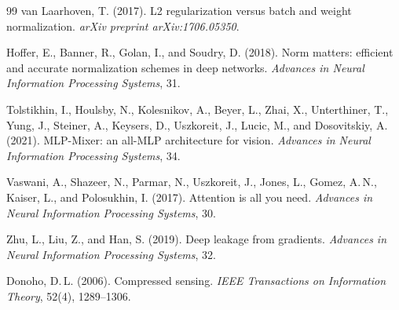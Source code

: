 \documentclass{article}
\begin{document}
{\begin{thebibliography}{99}
van Laarhoven, T. (2017).
L2 regularization versus batch and weight normalization.
\textit{arXiv preprint arXiv:1706.05350}.

Hoffer, E., Banner, R., Golan, I., and Soudry, D. (2018).
Norm matters: efficient and accurate normalization schemes in deep
networks.
\textit{Advances in Neural Information Processing Systems}, 31.

Tolstikhin, I., Houlsby, N., Kolesnikov, A., Beyer, L., Zhai, X.,
Unterthiner, T., Yung, J., Steiner, A., Keysers, D., Uszkoreit, J.,
Lucic, M., and Dosovitskiy, A. (2021).
MLP-Mixer: an all-MLP architecture for vision.
\textit{Advances in Neural Information Processing Systems}, 34.

Vaswani, A., Shazeer, N., Parmar, N., Uszkoreit, J., Jones, L.,
Gomez, A.\,N., Kaiser, L., and Polosukhin, I. (2017).
Attention is all you need.
\textit{Advances in Neural Information Processing Systems}, 30.

Zhu, L., Liu, Z., and Han, S. (2019).
Deep leakage from gradients.
\textit{Advances in Neural Information Processing Systems}, 32.

Donoho, D.\,L. (2006).
Compressed sensing.
\textit{IEEE Transactions on Information Theory}, 52(4), 1289--1306.

\end{thebibliography}
}

\appendix


\newpage

\end{document}
